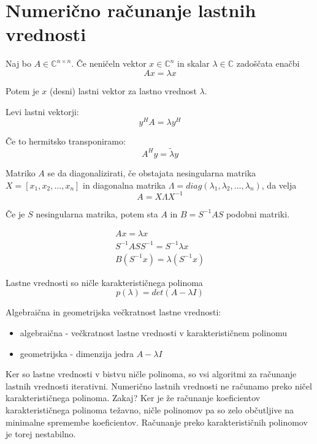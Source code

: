 \documentclass[a4paper,12pt]{article}
\theoremstyle{definition}
\theoremstyle{remark}
\newcommand{\C}{\mathbb{C}}
\begin{document}
\newpage
\section{Numerično računanje lastnih vrednosti}

Naj bo $A \in \C^{n \times n}$. Če neničeln vektor $x \in \C^n$ in skalar $\lambda \in \C$ zadoščata enačbi
\begin{equation*}
    Ax = \lambda x
\end{equation*}

Potem je $x$ (desni) lastni vektor za lastno vrednost $\lambda$.

Levi lastni vektorji:
\begin{equation*}
    y^H A = \lambda y^H
\end{equation*}

Če to hermitsko transponiramo:
\begin{equation*}
    A^H y = \tilde{\lambda} y
\end{equation*}

Matriko $A$ se da diagonalizirati, če obstajata nesingularna matrika $X = [x_1, x_2, \dots, x_n]$ in diagonalna matrika $\Lambda = diag(\lambda_1, \lambda_2, \dots, \lambda_n)$,
da velja
\begin{equation*}
    A = X \Lambda X^{-1}
\end{equation*}

Če je $S$ nesingularna matrika, potem sta $A$ in $B = S^{-1}AS$ podobni matriki.

\begin{gather*}
    Ax = \lambda x \\
    S^{-1} AS S^{-1} = S^{-1} \lambda x \\
    B(S^{-1} x) = \lambda (S^{-1} x)
\end{gather*}


Lastne vrednosti so ničle karakterističnega polinoma
\begin{equation*}
    p(\lambda) = det(A - \lambda I)
\end{equation*}

Algebraična in geometrijska večkratnost lastne vrednosti:
\begin{itemize}
    \item algebraična - večkratnost lastne vrednosti v karakterističnem polinomu
    \item geometrijska - dimenzija jedra $A - \lambda I$
\end{itemize}

Ker so lastne vrednosti v bistvu ničle polinoma, so vsi algoritmi za računanje lastnih vrednosti iterativni. Numerično lastnih vrednosti ne računamo
preko ničel karakterističnega polinoma. Zakaj? Ker je že računanje koeficientov karakterističnega polinoma težavno, ničle polinomov pa so zelo občutljive
na minimalne spremembe koeficientov. Računanje preko karakterističnih polinomov je torej nestabilno.
\end{document}
